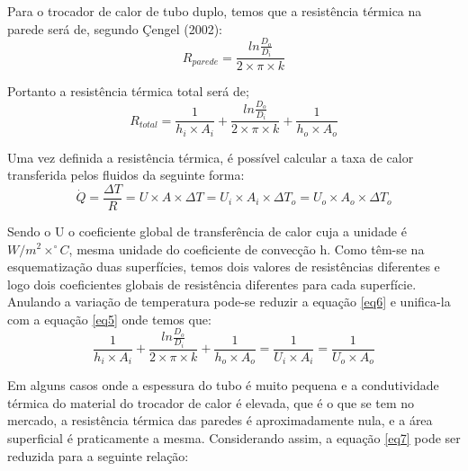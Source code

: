 \documentclass[a4paper,12pt,oneside]{article}
\begin{document}
\begin{flushright}
Para o trocador de calor de tubo duplo, temos que a resistência térmica na parede será de, segundo Çengel (2002):\\

\begin{equation}\label{eq4}
R_{parede} = \frac{ln \frac{D_{o}}{D_{i}}}{2 \times \pi \times k}
\end{equation}
\vspace{0.5cm}

Portanto a resistência térmica total será de;\\

\begin{equation}\label{eq5}
R_{total} = \frac{1}{h_{i} \times A_{i}} + \frac{ln \frac{D_{o}}{D_{i}}}{2 \times \pi \times k} + \frac{1}{h_{o} \times A_{o}}
\end{equation}
\vspace{0.5cm}

Uma vez definida a resistência térmica, é possível calcular a taxa de calor transferida pelos fluidos da seguinte forma:\\

\begin{equation}\label{eq6}
\dot{Q} = \frac{\Delta T}{R} = U \times A \times \Delta T = U_{i} \times A_{i} \times \Delta T_{o} = U_{o} \times A_{o} \times \Delta T_{o}
\end{equation}
\vspace{0.5cm}

Sendo o U o coeficiente global de transferência de calor cuja a unidade é $W/m^2\times ^\circ C$, mesma unidade do coeficiente de convecção h. Como têm-se na esquematização duas superfícies, temos dois valores de resistências diferentes e logo dois coeficientes globais de resistência diferentes para cada superfície. Anulando a variação de temperatura pode-se reduzir a equação \ref{eq6} e unifica-la com a equação \ref{eq5} onde temos que:\\


\begin{equation}\label{eq7}
\frac{1}{h_{i} \times A_{i}} + \frac{ln \frac{D_{o}}{D_{i}}}{2 \times \pi \times k} + \frac{1}{h_{o} \times A_{o}} = \frac{1}{U_{i} \times A_{i}} = \frac{1}{U_{o} \times A_{o}}
\end{equation}
\vspace{0.5cm}

Em alguns casos onde a espessura do tubo é muito pequena e a condutividade térmica do material do trocador de calor é elevada, que é o que se tem no mercado, a resistência térmica das paredes é aproximadamente nula, e a área superficial é praticamente a mesma. Considerando assim, a equação \ref{eq7} pode ser reduzida para a seguinte relação:
\pagebreak
\clearpage
\newpage



\end{flushright}
\end{document}
